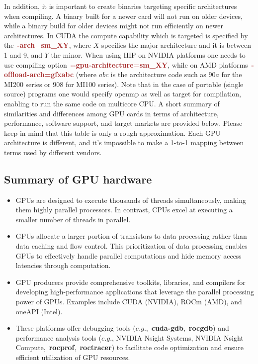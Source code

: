 \par
In addition, it is important to create binaries targeting specific architectures when compiling.
A binary built for a newer card will not run on older devices, while a binary build for older devices might not run efficiently on newer architectures.
In CUDA the compute capability which is targeted is specified by the~\textbf{\textcolor{brown}{-arch=sm\_XY}}, where $X$ specifies the major architecture and it is between 1 and 9, and $Y$ the minor.
When using HIP on NVIDIA platforms one needs to use compiling option~\textbf{\textcolor{brown}{-{}-gpu-architecture=sm\_XY}}, while on AMD platforms~\textbf{\textcolor{brown}{-offload-arch=gfxabc}} (where $abc$ is the architecture code such as $90a$ for the MI200 series or $908$ for MI100 series).
Note that in the case of portable (single source) programs one would specify openmp as well as target for compilation, enabling to run the same code on multicore CPU.
A short summary of similarities and differences among GPU cards in terms of architecture, performance, software support, and target markets are provided below.
Please keep in mind that this table is only a rough approximation.
Each GPU architecture is different, and it’s impossible to make a 1-to-1 mapping between terms used by different vendors.




\subsection{Summary of GPU hardware}


\begin{itemize}
    \item GPUs are designed to execute thousands of threads simultaneously, making them highly parallel processors. In contrast, CPUs excel at executing a smaller number of threads in parallel.
    \item GPUs allocate a larger portion of transistors to data processing rather than data caching and flow control. This prioritization of data processing enables GPUs to effectively handle parallel computations and hide memory access latencies through computation.
    \item GPU producers provide comprehensive toolkits, libraries, and compilers for developing high-performance applications that leverage the parallel processing power of GPUs. Examples include CUDA (NVIDIA), ROCm (AMD), and oneAPI (Intel).
    \item These platforms offer debugging tools ($e.g.$,~\textbf{cuda-gdb},~\textbf{rocgdb}) and performance analysis tools ($e.g.$, NVIDIA Nsight Systems, NVIDIA Nsight Compute,~\textbf{rocprof},~\textbf{roctracer}) to facilitate code optimization and ensure efficient utilization of GPU resources.
\end{itemize}

